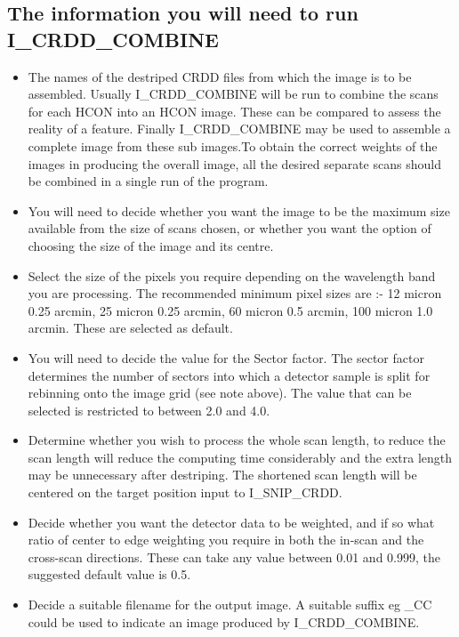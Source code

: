 \subsection{The information you will need to run I\_CRDD\_COMBINE}

\begin{itemize}

\item The names of the destriped CRDD files from which the image is to be
assembled. Usually I\_CRDD\_COMBINE will be run to combine the scans for each 
HCON into an HCON image. These can be compared to assess the reality of a 
feature. Finally I\_CRDD\_COMBINE may be used to assemble a complete image from 
these sub images.To obtain the correct weights of the images in producing the 
overall image, all the desired separate scans should be combined in a single 
run of the program.

\item You will need to decide whether you want the image to be the maximum size
available from the size of scans chosen, or whether you want the option of
choosing the size of the image and its centre.

\item Select the size of the pixels you require depending
on the wavelength band you are processing. The recommended minimum pixel sizes
are :- 12 micron  0.25 arcmin, 25 micron  0.25 arcmin, 60 micron   0.5 arcmin,
100 micron  1.0 arcmin. These are selected as default.

\item You will need to decide the value for the Sector factor. The sector factor
determines the number of sectors into which a detector sample is split for 
rebinning onto the image grid (see note above). The value that can be selected
is restricted to between 2.0 and 4.0.

\item Determine whether you wish to process the whole scan length, to reduce
the scan length will reduce the computing time considerably and the extra
length may be unnecessary after destriping. The shortened scan length will be
centered on the target position input to I\_SNIP\_CRDD.

\item Decide whether you want the detector data to be weighted, and if so what 
ratio of center to edge weighting you require in both the in-scan and the
cross-scan directions. These can take any value between 0.01 and 0.999, the
suggested default value is 0.5.

\item Decide a suitable filename for the output image. A suitable suffix eg \_CC
could be used to indicate an image produced by I\_CRDD\_COMBINE.

\end{itemize}

